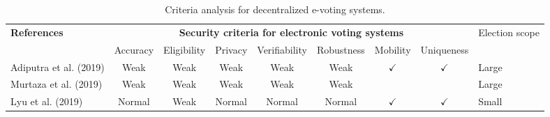 \documentclass[../access.tex]{subfiles}
\begin{document}
\begin{table}[htbp]
    \caption{Criteria analysis for decentralized e-voting systems.}
    \begin{adjustwidth}{-2cm}{}
        \begin{tabular}{m{4.4cm} c c c c c c c >{\centering\arraybackslash}m{0.7cm}} %
            \toprule
            \multirow{3.5}{=}{\textbf{\footnotesize{References}}}          & \multicolumn{7}{c}{\textbf{\footnotesize{Security criteria for electronic voting systems}}} & \multirow{3.5}{=}{\footnotesize{Election scope}}                                                                                                                                                                  \\
            \cline{2-8}
            \vspace{0.5cm}
            \multirow{2}{=}{}                                              & \footnotesize{Accuracy}                                                                     & \footnotesize{Eligibility}                       & \footnotesize{Privacy} & \footnotesize{Verifiability} & \footnotesize{Robustness} & \footnotesize{Mobility} & \footnotesize{Uniqueness} & \multirow{2}{=}{}    \\
            \hline
            \footnotesize{Adiputra et al. (2019) \cite{Adiputra2019}}      & {Weak}                                                                                      & {Weak}                                           & {Weak}                 & {Weak}                       & {Weak}                    & $ \checkmark $          & $ \checkmark $            & \footnotesize{Large} \\
            \hline
            \footnotesize{Murtaza et al. (2019) \cite{Murtaza2019}}        & {Weak}                                                                                      & {Weak}                                           & {Weak}                 & {Weak}                       & {Weak}                    & {}                      & {}                        & \footnotesize{Large} \\
            \hline
            \footnotesize{Lyu et al. (2019) \cite{Lyu2019}}                & {Normal}                                                                                    & {Weak}                                           & {Normal}               & {Normal}                     & {Normal}                  & $ \checkmark $          & $ \checkmark $            & \footnotesize{Small} \\

\end{tabular}
\end{adjustwidth}
\end{table}
\end{document}
